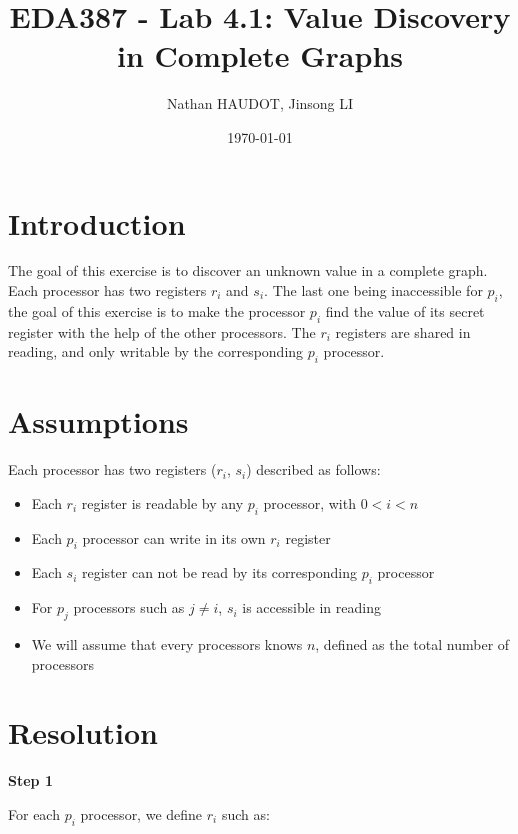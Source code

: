 \documentclass{article}
\title{EDA387 - Lab 4.1: Value Discovery in Complete Graphs}
\author{Nathan HAUDOT, Jinsong LI}
\date{\today}
\begin{document}
\maketitle


\section{Introduction}

The goal of this exercise is to discover an unknown value in a complete graph. Each processor has two registers $r_{i}$ and $s_{i}$. The last one being inaccessible for $p_{i}$, the goal of this exercise is to make the processor $p_{i}$ find the value of its secret register with the help of the other processors. The $r_{i}$ registers are shared in reading, and only writable by the corresponding $p_{i}$ processor.

\section{Assumptions}

Each processor has two registers ($r_{i}$, $s_{i}$) described as follows:

\begin{itemize}

\item Each $r_{i}$ register is readable by any $p_{i}$ processor, with $0 < i < n$

\item Each $p_{i}$ processor can write in its own $r_{i}$ register

\item Each $s_{i}$ register can not be read by its corresponding $p_{i}$ processor

\item For $p_{j}$ processors such as $j\neq i$, $s_{i}$ is accessible in reading

\item We will assume that every processors knows $n$, defined as the total number of processors

\end{itemize}



\section{Resolution}

\textbf{Step 1}

For each $p_{i}$ processor, we define $r_{i}$ such as:
\end{document}
